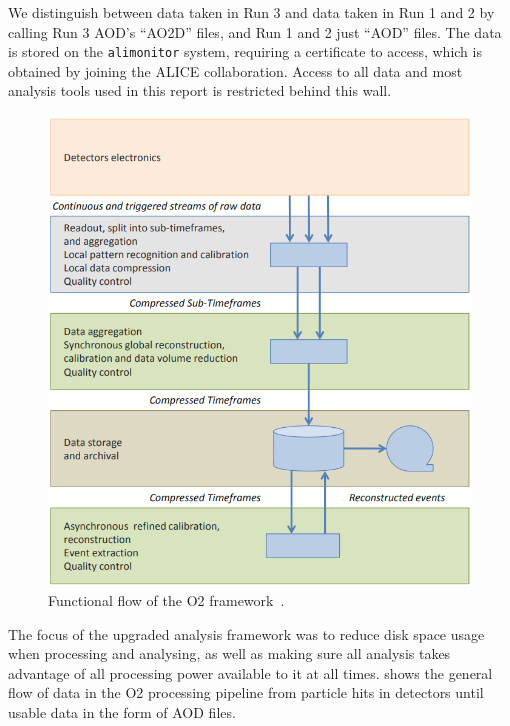 We distinguish between data taken in Run 3 and data taken in Run 1 and 2 by calling Run 3 AOD's ``AO2D'' files, and Run 1 and 2 just ``AOD'' files. The data is stored on the \texttt{alimonitor} system, requiring a certificate to access, which is obtained by joining the ALICE collaboration. Access to all data and most analysis tools used in this report is restricted behind this wall. 

\begin{figure}[h]
    \begin{center}
        \includegraphics[width=.6\textwidth]{Figs/O2_flow.png}
        \caption{Functional flow of the O2 framework~\cite{O2_Upgrade_TDR}.}
        \label{fig:O2_flow}
    \end{center}
\end{figure}

The focus of the upgraded analysis framework was to reduce disk space usage when processing and analysing, as well as making sure all analysis takes advantage of all processing power available to it at all times.  shows the general flow of data in the O2 processing pipeline from particle hits in detectors until usable data in the form of AOD files.

